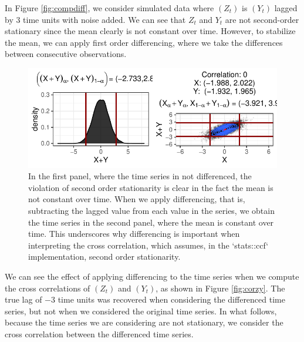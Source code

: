 \documentclass[12pt,twoside]{smiththesis}
\begin{document}
In Figure \ref{fig:compdiff}, we consider simulated data where \((Z_t)\) is \((Y_t)\) lagged by 3 time units with noise added. We can see that \(Z_t\) and \(Y_t\) are not second-order stationary since the mean clearly is not constant over time. However, to stabilize the mean, we can apply first order differencing, where we take the differences between consecutive observations.
\begin{figure}
\includegraphics[width=1\linewidth]{thesis_files/figure-latex/unnamed-chunk-86-1} \caption{\label{fig:compdiff}In the first panel, where the time series in not differenced, the violation of second order stationarity is clear in the fact the mean is not constant over time. When we apply differencing, that is, subtracting the lagged value from each value in the series, we obtain the time series in the second panel, where the mean is constant over time. This underscores why differencing is important when interpreting the cross correlation, which assumes, in the `stats::ccf` implementation, second order stationarity.}\label{fig:unnamed-chunk-86}
\end{figure}
We can see the effect of applying differencing to the time series when we compute the cross correlations of \((Z_t)\) and \((Y_t)\), as shown in Figure \ref{fig:corzy}. The true lag of \(-3\) time units was recovered when considering the differenced time series, but not when we considered the original time series. In what follows, because the time series we are considering are not stationary, we consider the cross correlation between the differenced time series.
\vspace{5 cm}
\end{document}
